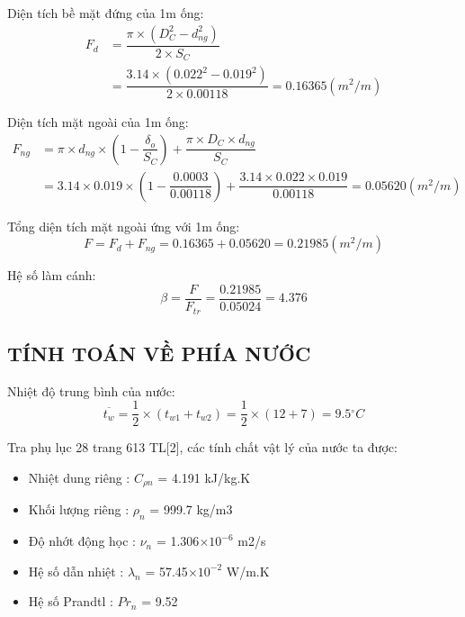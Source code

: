 Diện tích bề mặt đứng của 1m ống:
\begin{equation*}
	\begin{split}
		F_{d} &= \dfrac{\pi\times(D_{C}^2 - d_{ng}^2)}{2\times S_{C}}\\
		&= \dfrac{3.14 \times (0.022^2 - 0.019^2)}{2 \times 0.00118}=0.16365(m^2/m)
	\end{split} 
\end{equation*}

Diện tích mặt ngoài của 1m ống:
\begin{equation*}
	\begin{split}
		F_{ng} &= \pi\times d_{ng}\times\left(1 - \dfrac{\delta_{o}}{S_{C}}\right) + \dfrac{\pi\times D_{C}\times d_{ng}}{S_{C}} \\
		&= 3.14 \times 0.019 \times (1 - \dfrac{0.0003}{0.00118}) + \dfrac{3.14 \times 0.022 \times 0.019}{0.00118}= 0.05620(m^2/m)
	\end{split}
\end{equation*}

Tổng diện tích mặt ngoài ứng với 1m ống:
\begin{equation*}
	F = F_{d} + F_{ng} = 0.16365 + 0.05620 = 0.21985(m^2/m)
\end{equation*}

Hệ số làm cánh:
\begin{equation*}
	\beta = \dfrac{F}{F_{tr}} = \dfrac{0.21985}{0.05024}=4.376
\end{equation*}

\subsection{TÍNH TOÁN VỀ PHÍA NƯỚC}
Nhiệt độ trung bình của nước:
\begin{equation*}
	\overline{t_{w}} = \dfrac{1}{2}\times(t_{w1} + t_{w2}) = \dfrac{1}{2} \times (12+7)=9.5{^\circ}C
\end{equation*}

Tra phụ lục 28 trang 613 TL[2], các tính chất vật lý của nước ta được:
\begin{itemize}
	\item Nhiệt dung riêng : $C_{\rho n}$ = 4.191 kJ/kg.K
	\item Khối lượng riêng : $ \rho_{n} $ = 999.7 kg/m3
	\item Độ nhớt động học : $ \nu_{n} $ = 1.306$\times10^{-6}$ m2/s
	\item Hệ số dẫn nhiệt : $ \lambda_{n} $ = 57.45$\times10^{-2}$ W/m.K
	\item Hệ số Prandtl : $ Pr_{n} $ = 9.52
\end{itemize}


